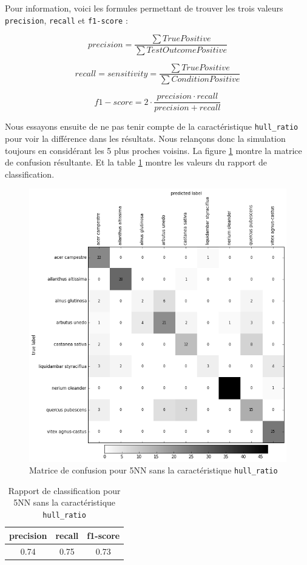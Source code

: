Pour information, voici les formules permettant de trouver les trois valeurs \texttt{precision}, \texttt{recall} et \texttt{f1-score} :

\[ precision = \frac{\sum TruePositive}{\sum TestOutcomePositive} \]

\[ recall = sensitivity = \frac{\sum TruePositive}{\sum ConditionPositive} \]

\[ f1-score = 2 \cdot \frac{precision \cdot recall}{precision + recall} \]

\newpage 

Nous essayons ensuite de ne pas tenir compte de la caractéristique \texttt{hull\_ratio} pour voir la différence dans les résultats. Nous relançons donc la simulation toujours en considérant les 5 plus proches voisins. La figure \ref{5nnwithouthull} montre la matrice de confusion résultante. Et la table \ref{5nncrwithouthull} montre les valeurs du rapport de classification.

\begin{figure}[h]
  \centering
    \includegraphics[width=0.6\linewidth]{img/5NNwithoutHull.png}
  \caption{Matrice de confusion pour 5NN sans la caractéristique \texttt{hull\_ratio}}
  \label{5nnwithouthull}
\end{figure}

\begin{table}[h]
  \centering
  \footnotesize
  \begin{tabular}{|c|c|c|}  
    \hline
    precision & recall & f1-score \\
    \hline
    0.74 & 0.75 &0.73 \\
    \hline
  \end{tabular}
  \label{5nncrwithouthull}
  \caption{Rapport de classification pour 5NN sans la caractéristique \texttt{hull\_ratio}}
\end{table}

